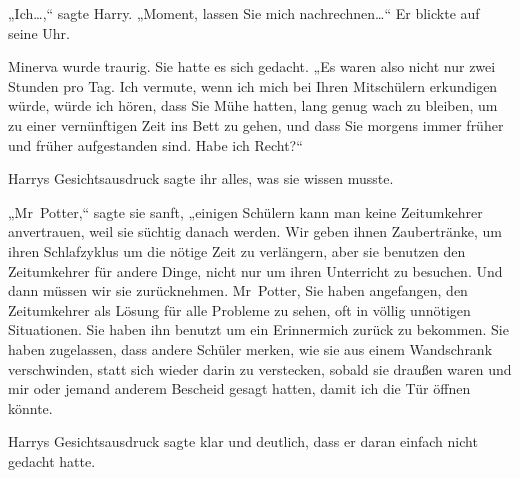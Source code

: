 „Ich…,“ sagte Harry. „Moment, lassen Sie mich nachrechnen…“ Er blickte auf seine Uhr.

Minerva wurde traurig. Sie hatte es sich gedacht. „Es waren also nicht nur zwei Stunden pro Tag. Ich vermute, wenn ich mich bei Ihren Mitschülern erkundigen würde, würde ich hören, dass Sie Mühe hatten, lang genug wach zu bleiben, um zu einer vernünftigen Zeit ins Bett zu gehen, und dass Sie morgens immer früher und früher aufgestanden sind. Habe ich Recht?“

Harrys Gesichtsausdruck sagte ihr alles, was sie wissen musste.

„Mr~Potter,“ sagte sie sanft, „einigen Schülern kann man keine Zeitumkehrer anvertrauen, weil sie süchtig danach werden. Wir geben ihnen Zaubertränke, um ihren Schlafzyklus um die nötige Zeit zu verlängern, aber sie benutzen den Zeitumkehrer für andere Dinge, nicht nur um ihren Unterricht zu besuchen. Und dann müssen wir sie zurücknehmen. Mr~Potter, Sie haben angefangen, den Zeitumkehrer als Lösung für alle Probleme zu sehen, oft in völlig unnötigen Situationen. Sie haben ihn benutzt um ein Erinnermich zurück zu bekommen. Sie haben zugelassen, dass andere Schüler merken, wie sie aus einem Wandschrank verschwinden, statt sich wieder darin zu verstecken, sobald sie draußen waren und mir oder jemand anderem Bescheid gesagt hatten, damit ich die Tür öffnen könnte.

Harrys Gesichtsausdruck sagte klar und deutlich, dass er daran einfach nicht gedacht hatte.

